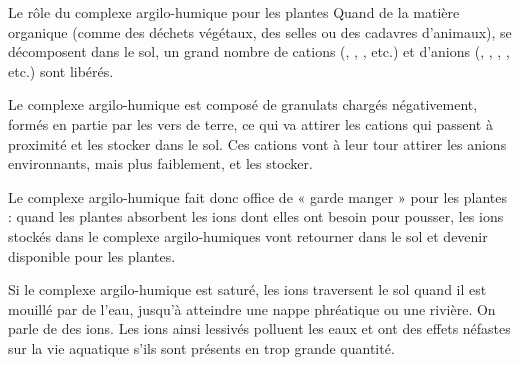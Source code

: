 \begin{doc}{Le rôle du complexe argilo-humique pour les plantes}
  Quand de la matière organique (comme des déchets végétaux, des selles ou des cadavres d'animaux), se décomposent dans le sol, un grand nombre de cations (\ionPotassium, \ionSodium, \ammonium, etc.) et d'anions (\ionPhosphate, \nitrate, \nitrite, \sulfate, etc.) sont libérés.

  Le complexe argilo-humique est composé de granulats chargés négativement, formés en partie par les vers de terre, ce qui va attirer les cations qui passent à proximité et les stocker dans le sol. 
  Ces cations vont à leur tour attirer les anions environnants, mais plus faiblement, et les stocker.

  \begin{importants}
    Le complexe argilo-humique fait donc office de « garde manger » pour les plantes : quand les plantes absorbent les ions dont elles ont besoin pour pousser, les ions stockés dans le complexe argilo-humiques vont retourner dans le sol et devenir disponible pour les plantes.
  \end{importants}

  Si le complexe argilo-humique est saturé, les ions traversent le sol quand il est mouillé par de l'eau, jusqu'à atteindre une nappe phréatique ou une rivière.
  On parle de  des ions.
  Les ions ainsi lessivés polluent les eaux et ont des effets néfastes sur la vie aquatique s'ils sont présents en trop grande quantité.
\end{doc}


